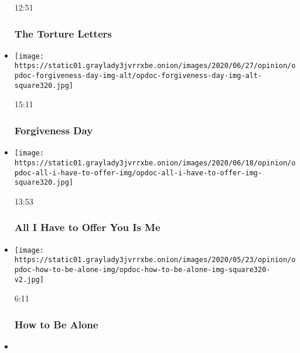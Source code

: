 \begin{itemize}
  12:51

  \hypertarget{the-torture-letters}{%
  \subsubsection{The Torture Letters}\label{the-torture-letters}}
\item
  \href{https://www.nytimes3xbfgragh.onion/video/opinion/100000007172575/forgiveness-day.html?action=click\&module=video-series-bar\&region=header\&pgtype=Article\&playlistId=video/op-docs}{}

  \texttt{[image: https://static01.graylady3jvrrxbe.onion/images/2020/06/27/opinion/opdoc-forgiveness-day-img-alt/opdoc-forgiveness-day-img-alt-square320.jpg]}

  15:11

  \hypertarget{forgiveness-day}{%
  \subsubsection{Forgiveness Day}\label{forgiveness-day}}
\item
  \href{https://www.nytimes3xbfgragh.onion/video/opinion/100000007133685/all-i-have-to-offer-you-is-me.html?action=click\&module=video-series-bar\&region=header\&pgtype=Article\&playlistId=video/op-docs}{}

  \texttt{[image: https://static01.graylady3jvrrxbe.onion/images/2020/06/18/opinion/opdoc-all-i-have-to-offer-img/opdoc-all-i-have-to-offer-img-square320.jpg]}

  13:53

  \hypertarget{all-i-have-to-offer-you-is-me}{%
  \subsubsection{All I Have to Offer You Is
  Me}\label{all-i-have-to-offer-you-is-me}}
\item
  \href{https://www.nytimes3xbfgragh.onion/video/opinion/100000007139379/how-to-be-alone.html?action=click\&module=video-series-bar\&region=header\&pgtype=Article\&playlistId=video/op-docs}{}

  \texttt{[image: https://static01.graylady3jvrrxbe.onion/images/2020/05/23/opinion/opdoc-how-to-be-alone-img/opdoc-how-to-be-alone-img-square320-v2.jpg]}

  6:11

  \hypertarget{how-to-be-alone}{%
  \subsubsection{How to Be Alone}\label{how-to-be-alone}}
\item
  \href{https://www.nytimes3xbfgragh.onion/video/opinion/100000006590759/container-greece-migrants.html?action=click\&module=video-series-bar\&region=header\&pgtype=Article\&playlistId=video/op-docs}{}


\end{itemize}
